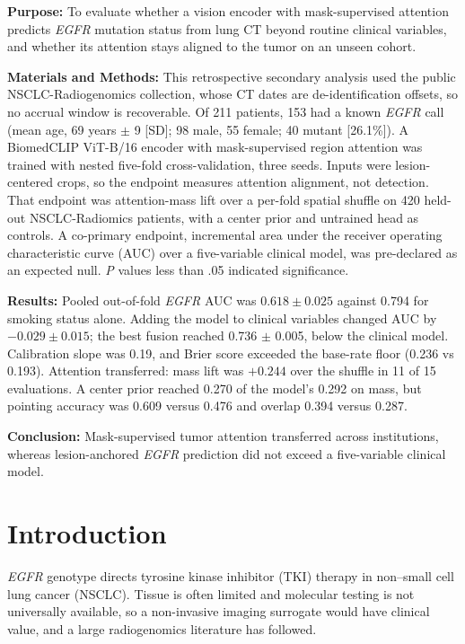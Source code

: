 \documentclass[11pt]{article}
\begin{document}
\textbf{Purpose:} To evaluate whether a vision encoder with mask-supervised
attention predicts \textit{EGFR} mutation status from lung CT beyond routine
clinical variables, and whether its attention stays aligned to the tumor on an
unseen cohort.

\textbf{Materials and Methods:} This retrospective secondary analysis used the
public NSCLC-Radiogenomics collection, whose CT dates are de-identification
offsets, so no accrual window is recoverable. Of 211 patients,
153 had a known \textit{EGFR} call (mean age, 69 years $\pm$ 9 [SD]; 98 male, 55
female; 40 mutant [26.1\%]). A BiomedCLIP ViT-B/16 encoder with mask-supervised
region attention was trained with nested five-fold cross-validation, three seeds.
Inputs were lesion-centered crops, so the endpoint measures attention alignment,
not detection. That endpoint was attention-mass lift over a per-fold spatial
shuffle on 420 held-out NSCLC-Radiomics patients, with a center prior and
untrained head as controls. A co-primary endpoint, incremental area under the receiver operating
characteristic curve (AUC) over a five-variable clinical model, was pre-declared
as an expected null. \textit{P} values less than .05 indicated significance.

\textbf{Results:} Pooled out-of-fold \textit{EGFR} AUC was $0.618 \pm 0.025$
against 0.794 for smoking status alone. Adding the model to clinical
variables changed AUC by $-0.029 \pm 0.015$; the best fusion reached
0.736 $\pm$ 0.005, below the clinical model. Calibration slope was 0.19, and
Brier score exceeded the base-rate floor (0.236 vs 0.193). Attention transferred:
mass lift was $+0.244$ over the shuffle in 11 of 15 evaluations. A center prior
reached 0.270 of the model's 0.292 on mass, but pointing accuracy was 0.609
versus 0.476 and overlap 0.394 versus 0.287.

\textbf{Conclusion:} Mask-supervised tumor attention transferred across
institutions, whereas lesion-anchored \textit{EGFR} prediction did not exceed a
five-variable clinical model.

\clearpage

\section*{Introduction}

\textit{EGFR} genotype directs tyrosine kinase inhibitor (TKI) therapy in
non--small cell lung cancer (NSCLC). Tissue is often limited and molecular testing
is not universally available, so a non-invasive imaging surrogate would have
clinical value, and a large radiogenomics literature has followed.
\end{document}
